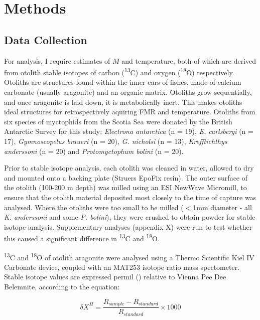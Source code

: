 \documentclass[12pt, titlepage]{article}
\begin{document}
\pagebreak
\section{Methods}

\subsection{Data Collection}

For analysis, I require estimates of $M$ and temperature, both of which are derived from otolith stable isotopes of carbon (\textdelta \textsuperscript{13}C) and oxygen (\textdelta \textsuperscript{18}O) respectively.
Otoliths are structures found within the inner ears of fishes,  made of calcium carbonate (usually aragonite) and an organic matrix. 
Otoliths grow sequentially, and once aragonite is laid down, it is metabolically inert.
This makes otoliths ideal structures for retrospectively aquiring FMR and temperature. %
Otoliths from six species of myctophids from the Scotia Sea were donated by the British Antarctic Survey for this study: \textit{Electrona antarctica} (n = 19), \textit{E. carlsbergi} (n = 17), \textit{Gymnoscopelus braueri} (n = 20), \textit{G. nicholsi} (n = 13), \textit{Krefftichthys anderssoni} (n = 20) and \textit{Protomyctophum bolini} (n = 20).

Prior to stable isotope analysis, each otolith was cleaned in water, allowed to dry and mounted onto a backing plate (Struers EpoFix resin).
The outer surface of the otolith (100-200 \textmu m depth) was milled using an ESI NewWave Micromill, to ensure that the otolith material deposited most closely to the time of capture was analysed.
Where the otoliths were too small to be milled ($<$1mm diameter - all \textit{K. anderssoni} and some \textit{P. bolini}), they were crushed to obtain powder for stable isotope analysis.
Supplementary analyses (appendix X) were run to test whether this caused a significant difference in \textdelta \textsuperscript{13}C and \textdelta \textsuperscript{18}O.

\textdelta \textsuperscript{13}C and \textdelta \textsuperscript{18}O of otolith aragonite were analysed using a Thermo Scientific Kiel IV Carbonate device, coupled with an MAT253 isotope ratio mass spectometer.
Stable isotope values are expressed permil (\permil) relative to Vienna Pee Dee Belemnite, according to the equation:

\begin{equation}
\delta X^{H} = \frac{R_{sample} - R_{standard}}{R_{standard}} \times 1000
\end{equation}
\end{document}
